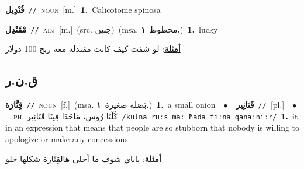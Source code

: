 \documentclass[10pt,a4paper,twoside]{article} %
\begin{document}
\begin{multicols}{2}
{\setlength\topsep{0pt}\textbf{\foreignlanguage{arabic}{قُنْدِيل}}\ {\color{gray}\texttt{//}\color{black}}\ \textsc{noun}\ [m.]\ \textbf{1.}~Calicotome spinosa\ } \vspace{2mm}

{\setlength\topsep{0pt}\textbf{\foreignlanguage{arabic}{مْقَنْدِل}}\ {\color{gray}\texttt{//}\color{black}}\ \textsc{adj}\ [m.]\ (src. \color{gray}\foreignlanguage{arabic}{جنين}\color{black})\ \color{gray}(msa. \foreignlanguage{arabic}{محظوظ}~\foreignlanguage{arabic}{\textbf{١.}})\color{black}\ \textbf{1.}~lucky\  \begin{flushright}\color{gray}\foreignlanguage{arabic}{\textbf{\underline{\foreignlanguage{arabic}{أمثلة}}}: لو شفت كيف كانت مقندلة معه ربح 100 دولار}\end{flushright}\color{black}} \vspace{2mm}

\vspace{-3mm}
\subsection*{\color{blue}\foreignlanguage{arabic}{ق.ن.ر}\color{blue}{}} 

{\setlength\topsep{0pt}\textbf{\foreignlanguage{arabic}{قِنَّارَة}}\ {\color{gray}\texttt{//}\color{black}}\ \textsc{noun}\ [f.]\ \color{gray}(msa. \foreignlanguage{arabic}{بَصَلة صغيرة}~\foreignlanguage{arabic}{\textbf{١.}})\color{black}\ \textbf{1.}~a small onion\ \ $\bullet$\ \ \setlength\topsep{0pt}\textbf{\foreignlanguage{arabic}{قَنَانِير}}\ {\color{gray}\texttt{//}\color{black}}\ [pl.]\ \ $\bullet$\ \ \textsc{ph.} \color{gray} \foreignlanguage{arabic}{كُلْنَا رُوس، مَاحَدَا فِينَا قَنَانِير}\color{black}\ {\color{gray}\texttt{/{\sffamily kulna ruːs maː ħada fiːna qanaːniːr}/}\color{black}}\ \textbf{1.}~it in an expression that means that people are so stubborn that nobody is willing to apologize or make any concessions.\  \begin{flushright}\color{gray}\foreignlanguage{arabic}{\textbf{\underline{\foreignlanguage{arabic}{أمثلة}}}: ياباي شوف ما أحلى هالقِنّارة شكلها حلو}\end{flushright}\color{black}} \vspace{2mm}


\end{multicols}
\end{document}
